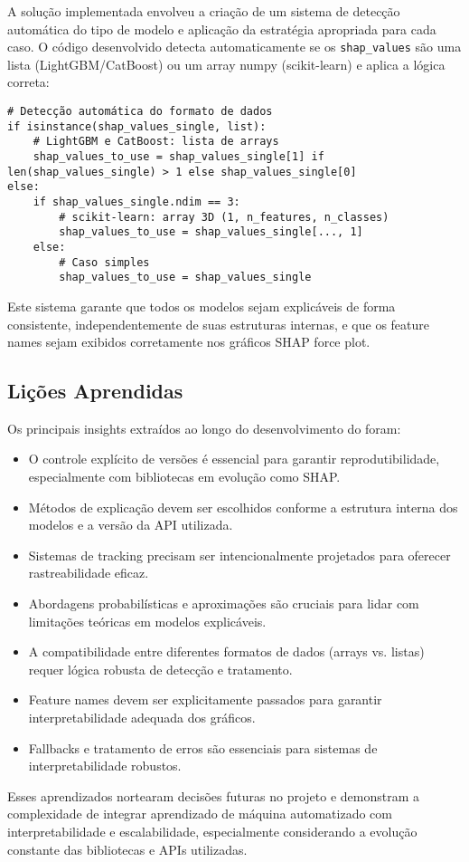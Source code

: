 A solução implementada envolveu a criação de um sistema de detecção automática do tipo de modelo e aplicação da estratégia apropriada para cada caso. O código desenvolvido detecta automaticamente se os \texttt{shap\_values} são uma lista (LightGBM/CatBoost) ou um array numpy (scikit-learn) e aplica a lógica correta:

\begin{verbatim}
# Detecção automática do formato de dados
if isinstance(shap_values_single, list):
    # LightGBM e CatBoost: lista de arrays
    shap_values_to_use = shap_values_single[1] if len(shap_values_single) > 1 else shap_values_single[0]
else:
    if shap_values_single.ndim == 3:
        # scikit-learn: array 3D (1, n_features, n_classes)
        shap_values_to_use = shap_values_single[..., 1]
    else:
        # Caso simples
        shap_values_to_use = shap_values_single
\end{verbatim}

Este sistema garante que todos os modelos sejam explicáveis de forma consistente, independentemente de suas estruturas internas, e que os feature names sejam exibidos corretamente nos gráficos SHAP force plot.

\subsection*{Lições Aprendidas}

Os principais insights extraídos ao longo do desenvolvimento do \toolname{} foram:

\begin{itemize}
    \item O controle explícito de versões é essencial para garantir reprodutibilidade, especialmente com bibliotecas em evolução como SHAP.
    \item Métodos de explicação devem ser escolhidos conforme a estrutura interna dos modelos e a versão da API utilizada.
    \item Sistemas de tracking precisam ser intencionalmente projetados para oferecer rastreabilidade eficaz.
    \item Abordagens probabilísticas e aproximações são cruciais para lidar com limitações teóricas em modelos explicáveis.
    \item A compatibilidade entre diferentes formatos de dados (arrays vs. listas) requer lógica robusta de detecção e tratamento.
    \item Feature names devem ser explicitamente passados para garantir interpretabilidade adequada dos gráficos.
    \item Fallbacks e tratamento de erros são essenciais para sistemas de interpretabilidade robustos.
\end{itemize}

Esses aprendizados nortearam decisões futuras no projeto e demonstram a complexidade de integrar aprendizado de máquina automatizado com interpretabilidade e escalabilidade, especialmente considerando a evolução constante das bibliotecas e APIs utilizadas. 